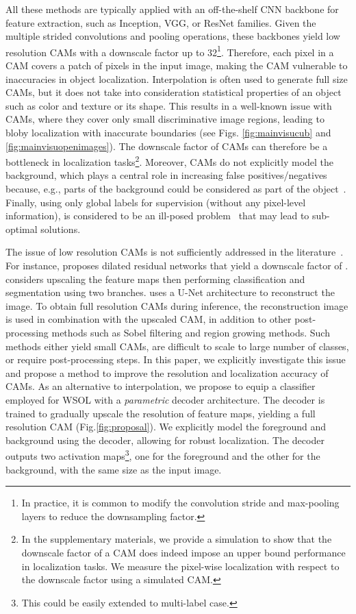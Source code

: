 \documentclass[twocolumn]{article}
\theoremstyle{definition}
\begin{document}
All these methods are typically applied with an off-the-shelf CNN backbone for feature extraction, such as Inception, VGG, or ResNet families. Given the multiple strided convolutions and pooling operations, these  backbones yield low resolution CAMs with a downscale factor up to 32\footnote{In practice, it is common to modify the convolution stride and max-pooling layers to reduce the downsampling factor.}.
Therefore, each pixel in a CAM covers a patch of  pixels in the input image, making the CAM vulnerable to inaccuracies in object localization. Interpolation is often used to generate full size CAMs, but it does not take into consideration statistical properties of an object such as color and texture or its shape. This results in a well-known issue with CAMs, where they cover only small discriminative image regions, leading to bloby localization with inaccurate boundaries (see Figs. \ref{fig:mainvisucub} and \ref{fig:mainvisuopenimages}).  The downscale factor of CAMs can therefore be a bottleneck in localization tasks\footnote{In the supplementary materials, we provide a simulation to show that the downscale factor of a CAM does indeed impose an upper bound performance in localization tasks. We measure the pixel-wise localization with respect to the downscale factor using a simulated CAM.}.
Moreover, CAMs do not explicitly model the background, which plays a central role in increasing false positives/negatives because, e.g., parts of the background could be considered as part of the object~\cite{rony2019weak-loc-histo-survey}.
Finally, using only global labels for supervision (without any pixel-level information), is considered to be an ill-posed problem~\cite{choe2020evaluating,WanWHJY19} that may lead to sub-optimal solutions.


The issue of low resolution CAMs is not sufficiently addressed in the literature~\cite{TagarisSS19,YuKF17,ZhangXWSH20RELI}. For instance, \cite{YuKF17} proposes dilated residual networks that yield a downscale factor of . \cite{ZhangXWSH20RELI} considers upscaling the feature maps then performing classification and segmentation using two branches. \cite{TagarisSS19} uses a U-Net architecture to reconstruct the image. To obtain full resolution CAMs during inference, the reconstruction image is used in combination with the upscaled CAM, in addition to other post-processing methods such as Sobel filtering and region growing methods. Such methods either yield small CAMs, are difficult to scale to large number of classes, or require post-processing steps.
In this paper, we explicitly investigate this issue and propose a method to improve the resolution and localization accuracy of CAMs. As an alternative to interpolation, we propose to equip a classifier employed for WSOL with a \emph{parametric} decoder architecture. The decoder is trained to gradually upscale the resolution of feature maps, yielding a full resolution CAM (Fig.\ref{fig:proposal}). We explicitly model the foreground and background using the decoder, allowing for robust localization. The decoder outputs two activation maps\footnote{This could be easily extended to multi-label case.}, one for the foreground and the other for the background, with the same size as the input image.
\end{document}
